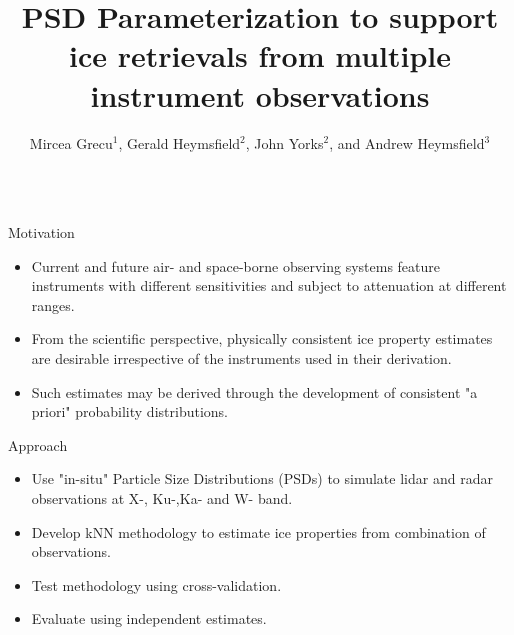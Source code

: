 \documentclass[final,t]{beamer}
\title[]{\huge PSD Parameterization to support ice retrievals from multiple
instrument observations}
\author[]{\large Mircea Grecu$^{1}$, Gerald Heymsfield$^{2}$, John Yorks$^{2}$, and Andrew Heymsfield$^3$}
\institute[]{\Large (1) Morgan State University,  (2) NASA GSFC, and (3) NCAR}
\date{}
\begin{document}
\begin{frame}
\maketitle
\begin{columns}[]
  \begin{column}{.32\linewidth}

\begin{block}{Motivation}
\begin{itemize}
\item
  Current and future air- and space-borne observing systems feature
  instruments with different sensitivities and subject to attenuation at
  different ranges.
\item
  From the scientific perspective, physically consistent ice property
  estimates are desirable irrespective of the instruments used in their
  derivation.
\item Such estimates may be derived through the development of consistent "a priori"
probability distributions.
\end{itemize}
\end{block}

\begin{block}{Approach}
\begin{itemize}
\item  Use "in-situ" Particle Size Distributions (PSDs) to simulate lidar and radar observations at X-, Ku-,Ka- and W- band.
\item  Develop kNN methodology to estimate ice properties from combination of observations.
\item Test methodology using cross-validation.
\item Evaluate using independent estimates.
\end{itemize}
\end{block}


\end{column}
\end{columns}
\end{frame}
\end{document}
